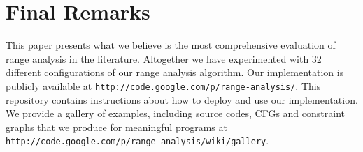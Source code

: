 \documentclass{llncs}
\begin{document}
\section{Final Remarks}
\label{sec:con}

This paper presents what we believe is the most comprehensive evaluation of
range analysis in the literature.
Altogether we have experimented with 32 different configurations of our
range analysis algorithm.
Our implementation is
publicly available at \texttt{http://code.google.com/p/range-analysis/}.
This repository contains instructions about how to deploy and use our
implementation.
We provide a gallery of examples, including source codes,
CFGs and constraint graphs that we produce for meaningful programs at
\texttt{http://code.google.com/p/range-analysis/wiki/gallery}.



\end{document}
